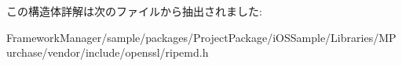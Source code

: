 この構造体詳解は次のファイルから抽出されました\+:\begin{DoxyCompactItemize}
\item 
Framework\+Manager/sample/packages/\+Project\+Package/i\+O\+S\+Sample/\+Libraries/\+M\+Purchase/vendor/include/openssl/ripemd.\+h\end{DoxyCompactItemize}
